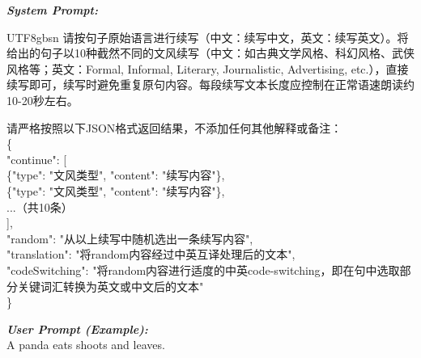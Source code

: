\documentclass[]{bytedance_seed}
\begin{document}
\begin{promptbox}
\textit{\textbf{System Prompt:} }\\
\begin{CJK*}{UTF8}{gbsn}
    请按句子原始语言进行续写（中文：续写中文，英文：续写英文）。将给出的句子以10种截然不同的文风续写（中文：如古典文学风格、科幻风格、武侠风格等；英文：Formal, Informal, Literary, Journalistic, Advertising, etc.），直接续写即可，续写时避免重复原句内容。每段续写文本长度应控制在正常语速朗读约10-20秒左右。

    请严格按照以下JSON格式返回结果，不添加任何其他解释或备注：\\
    \{\\
    "continue": [ \\
    \{"type": "文风类型", "content": "续写内容"\}, \\
    \{"type": "文风类型", "content": "续写内容"\}, \\
    ...（共10条） \\
    ], \\
    "random": "从以上续写中随机选出一条续写内容", \\
    "translation": "将random内容经过中英互译处理后的文本", \\
    "codeSwitching": "将random内容进行适度的中英code-switching，即在句中选取部分关键词汇转换为英文或中文后的文本"\\
    \}
\end{CJK*}

\medskip \textit{\textbf{User Prompt (Example):} }\\
A panda eats shoots and leaves.


\end{promptbox}
\end{document}

